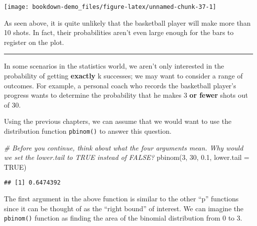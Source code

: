 \documentclass[
]{book}
\newenvironment{Shaded}{\begin{snugshade}}{\end{snugshade}}
\newcommand{\AttributeTok}[1]{\textcolor[rgb]{0.77,0.63,0.00}{#1}}
\newcommand{\CommentTok}[1]{\textcolor[rgb]{0.56,0.35,0.01}{\textit{#1}}}
\newcommand{\ConstantTok}[1]{\textcolor[rgb]{0.00,0.00,0.00}{#1}}
\newcommand{\DecValTok}[1]{\textcolor[rgb]{0.00,0.00,0.81}{#1}}
\newcommand{\FloatTok}[1]{\textcolor[rgb]{0.00,0.00,0.81}{#1}}
\newcommand{\FunctionTok}[1]{\textcolor[rgb]{0.00,0.00,0.00}{#1}}
\newcommand{\NormalTok}[1]{#1}
\newcommand{\SpecialCharTok}[1]{\textcolor[rgb]{0.00,0.00,0.00}{#1}}
\newcommand{\StringTok}[1]{\textcolor[rgb]{0.31,0.60,0.02}{#1}}
\begin{document}
\begin{center}\texttt{[image: bookdown-demo\_files/figure-latex/unnamed-chunk-37-1]} \end{center}

As seen above, it is quite unlikely that the basketball player will make more than 10 shots. In fact, their probabilities aren't even large enough for the bars to register on the plot.

\begin{center}\rule{0.5\linewidth}{0.5pt}\end{center}

In some scenarios in the statistics world, we aren't only interested in the probability of getting \textbf{exactly} k successes; we may want to consider a range of outcomes. For example, a personal coach who records the basketball player's progress wants to determine the probability that he makes 3 \textbf{or fewer} shots out of 30.

Using the previous chapters, we can assume that we would want to use the distribution function \texttt{pbinom()} to answer this question.

\begin{Shaded}
\begin{Highlighting}[]
\CommentTok{\# Before you continue, think about what the four arguments mean. Why would we set the lower.tail to TRUE instead of FALSE?}
\FunctionTok{pbinom}\NormalTok{(}\DecValTok{3}\NormalTok{, }\DecValTok{30}\NormalTok{, }\FloatTok{0.1}\NormalTok{, }\AttributeTok{lower.tail =} \ConstantTok{TRUE}\NormalTok{)}
\end{Highlighting}
\end{Shaded}

\begin{verbatim}
## [1] 0.6474392
\end{verbatim}

The first argument in the above function is similar to the other ``p'' functions since it can be thought of as the ``right bound'' of interest. We can imagine the \texttt{pbinom()} function as finding the area of the binomial distribution from 0 to 3.

\begin{Shaded}
\end{Shaded}
\end{document}
